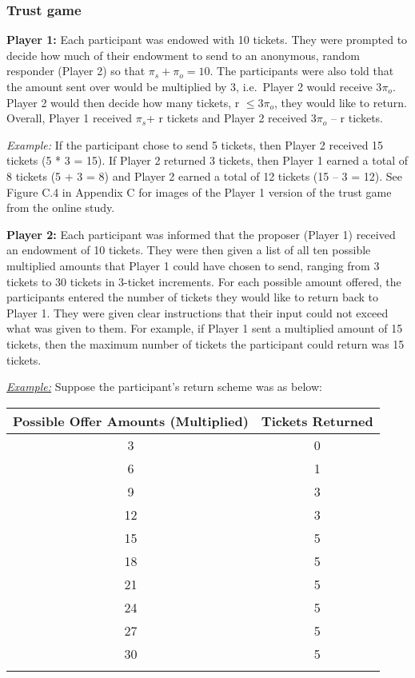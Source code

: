 \documentclass[12pt]{article}
\begin{document}
	
\subsubsection{Trust game}
\textbf{Player 1:} Each participant was endowed with 10 tickets. They were prompted to decide how much of their endowment to send to an anonymous, random responder (Player 2) so that \(\pi_{s} + \pi_{o} = 10\). The participants were also told that the amount sent over would be multiplied by 3, i.e.\ Player 2 would receive 3\(\pi_{o}\). Player 2 would then decide how many tickets, r \(\leq 3\pi_{o}\), they would like to return. Overall, Player 1 received \(\pi_{s}\)+ r tickets and Player 2 received 3\(\pi_{o}\) -- r tickets.

\textit{Example:} If the participant chose to send 5 tickets, then Player 2 received 15 tickets (5 * 3 = 15). If Player 2 returned 3 tickets, then Player 1 earned a total of 8 tickets (5 + 3 = 8) and Player 2 earned a total of 12 tickets (15 -- 3 = 12). See Figure C.4 in Appendix C for images of the Player 1 version of the trust game from the online study.

\textbf{Player 2:} Each participant was informed that the proposer (Player 1) received an endowment of 10 tickets. They were then given a list of all ten possible multiplied amounts that Player 1 could have chosen to send, ranging from 3 tickets to 30 tickets in 3-ticket increments. For each possible amount offered, the participants entered the number of tickets they would like to return back to Player 1. They were given clear instructions that their input could not exceed what was given to them. For example, if Player 1 sent a multiplied amount of 15 tickets, then the maximum number of tickets the participant could return was 15 tickets.

\underline{\textit{Example:}} Suppose the participant\rq s return scheme was as below: \\

\begin{center}
\begin{tabular}{ c c }
\hline \hline
 Possible Offer Amounts (Multiplied) & Tickets Returned \\ 
 \hline
3 & 0  \\  
6 & 1 \\  
9 & 3  \\  
12 & 3  \\  
15 & 5   \\  
18 & 5  \\  
21 & 5 \\  
24 & 5 \\  
27 & 5 \\  
30 & 5 \\  
\hline \hline \\
\end{tabular}
\end{center} 
\end{document}
